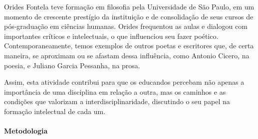 \documentclass[12pt]{extarticle}
\begin{document}
Orides Fontela teve formação em filosofia pela Universidade de São
Paulo, em um momento de crescente prestígio da instituição e de
consolidação de seus cursos de pós-graduação em ciências humanas. Orides
frequentou as aulas e dialogou com importantes críticos e intelectuais,
o que influenciou seu fazer poético. Contemporaneamente, temos exemplos
de outros poetas e escritores que, de certa maneira, se aproximam ou se
afastam dessa influência, como Antonio Cicero, na poesia, e Juliano
Garcia Pessanha, na prosa.

Assim, esta atividade contribui para que os educandos percebam não
apenas a importância de uma disciplina em relação a outra, mas os
caminhos e as condições que valorizam a interdisciplinaridade,
discutindo o seu papel na formação intelectual de cada um.

\paragraph{Metodologia} 
\end{document}
